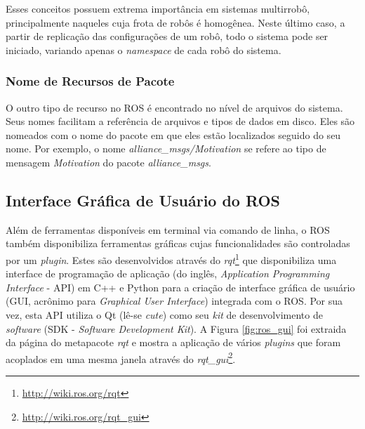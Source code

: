                 Esses conceitos possuem extrema importância em sistemas multirrobô, principalmente naqueles cuja frota de robôs é homogênea. Neste último caso, a partir de replicação das configurações de um robô, todo o sistema pode ser iniciado, variando apenas o \textit{namespace} de cada robô do sistema.
            
            \subsubsection{Nome de Recursos de Pacote} \label{subsubsec:ros_nomes_pacotes}
                O outro tipo de recurso no ROS é encontrado no nível de arquivos do sistema. Seus nomes facilitam a referência de arquivos e tipos de dados em disco. Eles são nomeados com o nome do pacote em que eles estão localizados seguido do seu nome. Por exemplo, o nome \textit{alliance\_msgs/Motivation} se refere ao tipo de mensagem \textit{Motivation} do pacote \textit{alliance\_msgs}.
            
        \subsection{Interface Gráfica de Usuário do ROS} \label{subsec:ros_gui}
            Além de ferramentas disponíveis em terminal via comando de linha, o ROS também disponibiliza ferramentas gráficas cujas funcionalidades são controladas por um \textit{plugin}. Estes são desenvolvidos através do \textit{rqt}\footnote{\url{http://wiki.ros.org/rqt}} que disponibiliza uma interface de programação de aplicação (do inglês, \textit{Application Programming Interface} - API) em C++ e Python para a criação de interface gráfica de usuário (GUI, acrônimo para \textit{Graphical User Interface}) integrada com o ROS. Por sua vez, esta API utiliza o Qt (lê-se \textit{cute}) como seu \textit{kit} de desenvolvimento de \textit{software} (SDK - \textit{Software Development Kit}). A Figura \ref{fig:ros_gui} foi extraida da página do metapacote \textit{rqt} e mostra a aplicação de vários \textit{plugins} que foram acoplados em uma mesma janela através do \textit{rqt\_gui}\footnote{\url{http://wiki.ros.org/rqt_gui}}.
            
